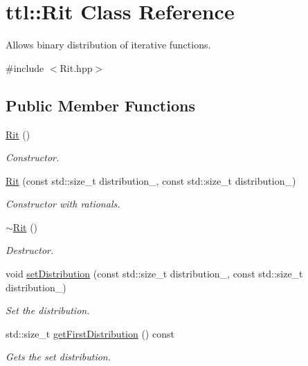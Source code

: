 \hypertarget{classttl_1_1_rit}{\section{ttl\-:\-:Rit Class Reference}
\label{classttl_1_1_rit}
}


Allows binary distribution of iterative functions.  




{\ttfamily \#include $<$Rit.\-hpp$>$}

\subsection*{Public Member Functions}
\begin{DoxyCompactItemize}
\item 
\hyperlink{classttl_1_1_rit_a3f5584e2b1d58b892aa2b6ad3aeac877}{Rit} ()
\begin{DoxyCompactList}\small\item\em Constructor. \end{DoxyCompactList}\item 
\hyperlink{classttl_1_1_rit_a550e51d3e9ddaebb8143e50a36a1fcc2}{Rit} (const std\-::size\-\_\-t distribution\-\_, const std\-::size\-\_\-t distribution\-\_)
\begin{DoxyCompactList}\small\item\em Constructor with rationals. \end{DoxyCompactList}\item 
\hyperlink{classttl_1_1_rit_a4818577eac04587831d5eaaf12550966}{$\sim$\-Rit} ()
\begin{DoxyCompactList}\small\item\em Destructor. \end{DoxyCompactList}\item 
void \hyperlink{classttl_1_1_rit_a3d9966f7c7aa134b7ca9822b82cb3a26}{set\-Distribution} (const std\-::size\-\_\-t distribution\-\_, const std\-::size\-\_\-t distribution\-\_)
\begin{DoxyCompactList}\small\item\em Set the distribution. \end{DoxyCompactList}\item 
std\-::size\-\_\-t \hyperlink{classttl_1_1_rit_ab603036b6e5b334833a3a487b9cb5b6c}{get\-First\-Distribution} () const 
\begin{DoxyCompactList}\small\item\em Gets the set distribution. \end{DoxyCompactList}\item 

\end{DoxyCompactItemize}
